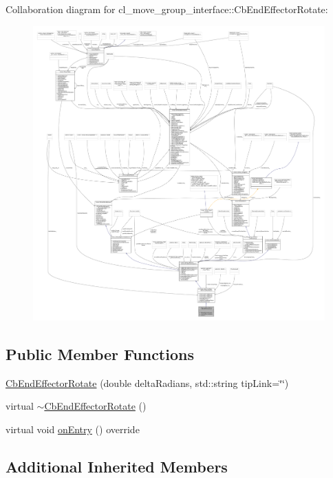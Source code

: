Collaboration diagram for cl\+\_\+move\+\_\+group\+\_\+interface\+:\+:Cb\+End\+Effector\+Rotate\+:
\nopagebreak
\begin{figure}[H]
\begin{center}
\leavevmode
\includegraphics[width=350pt]{classcl__move__group__interface_1_1CbEndEffectorRotate__coll__graph}
\end{center}
\end{figure}
\subsection*{Public Member Functions}
\begin{DoxyCompactItemize}
\item 
\hyperlink{classcl__move__group__interface_1_1CbEndEffectorRotate_a5a3f91fcbb0196baeaae40c4c38a59e8}{Cb\+End\+Effector\+Rotate} (double delta\+Radians, std\+::string tip\+Link=\char`\"{}\char`\"{})
\item 
virtual \hyperlink{classcl__move__group__interface_1_1CbEndEffectorRotate_a3c3590d9460c861aa9e146fbbbf4e396}{$\sim$\+Cb\+End\+Effector\+Rotate} ()
\item 
virtual void \hyperlink{classcl__move__group__interface_1_1CbEndEffectorRotate_a3e60bfba48906696587d66af89f7ee2b}{on\+Entry} () override
\end{DoxyCompactItemize}
\subsection*{Additional Inherited Members}


